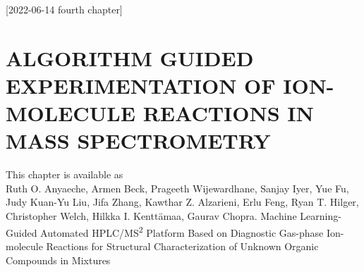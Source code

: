 [2022-06-14 fourth chapter]

\chapter{ALGORITHM GUIDED EXPERIMENTATION OF ION-MOLECULE REACTIONS IN MASS SPECTROMETRY}

This chapter is available as\\
\indent Ruth O. Anyaeche, Armen Beck, Prageeth Wijewardhane, Sanjay Iyer, Yue Fu, Judy Kuan-Yu Liu, Jifa Zhang, Kawthar Z. Alzarieni, Erlu Feng, Ryan T. Hilger, Christopher Welch, Hilkka I. Kenttämaa, Gaurav Chopra. Machine Learning-Guided Automated HPLC/MS\textsuperscript{2} Platform Based on Diagnostic Gas-phase Ion-molecule Reactions for Structural Characterization of Unknown Organic Compounds in Mixtures
